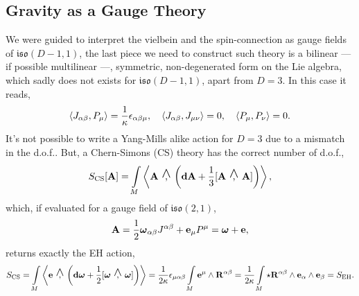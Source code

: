 \documentclass[a0,portrait]{a0poster}
\newcommand{\wedgecomma}{\stackon[1pt]{,}{\smash{\scriptsize$\wedge$}}}
\newcommand{\wedgecomm}[2]{\qty[ #1\ \wedgecomma\ #2 ]}
\begin{document}
\begin{multicols}{2}
\section*{Gravity as a Gauge Theory}

We were guided to interpret the vielbein and the spin-connection as gauge fields of $\mathfrak{iso}(D-1,1)$, the last piece we need 
to construct such theory is a bilinear --- if possible multilinear ---, symmetric, non-degenerated form on the Lie algebra, which sadly does 
not exists for $\mathfrak{iso}(D-1,1)$, apart from $D=3$. In this case it reads,
\[\expval{J_{\alpha\beta},P_\mu}=\frac1\kappa\epsilon_{\alpha\beta\mu},\ \ \ \expval{J_{\alpha\beta},J_{\mu\nu}}=0,\ \ \ \expval{P_\mu,P_\nu}=0.\]
It's not possible to write a Yang-Mills alike action for $D=3$ due to a mismatch in the d.o.f.. But, a Chern-Simons (CS) theory has the correct number of d.o.f.,
\[S_{\textnormal{CS}}\qty[\vb A]=\int\limits_M\expval{\vb A\ \wedgecomma\ \qty(\vb d{\vb A}+\frac13\wedgecomm{\vb A}{\vb A})},\]
which, if evaluated for a gauge field of $\mathfrak {iso}(2,1)$, \[\vb A = \frac12\boldsymbol\omega_{\alpha\beta}J^{\alpha\beta}+\vb e_\mu P^\mu=\boldsymbol\omega+\vb e,\] returns exactly the EH action,
\[S_{\textnormal{CS}}=\int\limits_M\expval{\vb e\ \wedgecomma\ \qty(\vb d{\boldsymbol\omega}+\frac12\wedgecomm{\boldsymbol\omega}{\boldsymbol\omega})}=\frac{1}{2\kappa}\epsilon_{\mu\alpha\beta}\int\limits_M\vb e^\mu\wedge \vb R^{\alpha\beta}=\frac{1}{2\kappa}\int\limits_M\star\vb R^{\alpha\beta}\wedge \vb e_\alpha\wedge \vb e_\beta=S_{\textnormal{EH}}.\]




\end{multicols}
\end{document}
